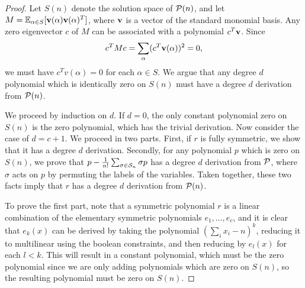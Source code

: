 \begin{proof}
Let $S(n)$ denote the solution space of $\mathcal P(n)$, and let $M = \operatorname*{\mathbb{E}}_{\alpha \in S}[{\bf v}(\alpha){\bf v}(\alpha)^T]$, where ${\bf v}$ is a vector of the standard monomial basis. Any zero eigenvector $c$ of $M$ can be associated with a polynomial $c^T{\bf v}$. Since 
\[c^TMc = \sum_\alpha (c^T{\bf v}(\alpha))^2 = 0,\]
we must have $c^Tv(\alpha) = 0$ for each $\alpha \in S$. We argue that any degree $d$ polynomial which is identically zero on $S(n)$ must have a degree $d$ derivation from $\mathcal P(n)$. 

We proceed by induction on $d$. If $d = 0$, the only constant polynomial zero on $S(n)$ is the zero polynomial, which has the trivial derivation. Now consider the case of $d = c+1$. We proceed in two parts. First, if $r$ is fully symmetric, we show that it has a degree $d$ derivation. Secondly, for any polynomial $p$ which is zero on $S(n)$, we prove that $p - \frac{1}{n!}\sum_{\sigma \in \mathcal S_n} \sigma p$ has a degree $d$ derivation from $\mathcal P$, where $\sigma$ acts on $p$ by permuting the labels of the variables. Taken together, these two facts imply that $r$ has a degree $d$ derivation from $\mathcal P(n)$.

To prove the first part, note that a symmetric polynomial $r$ is a linear combination of the elementary symmetric polynomials $e_1,\dots,e_c$, and it is clear that $e_k(x)$ can be derived by taking the polynomial $(\sum_i x_i - n)^k$, reducing it to multilinear using the boolean constraints, and then reducing by $e_l(x)$ for each $l < k$. This will result in a constant polynomial, which must be the zero polynomial since we are only adding polynomials which are zero on $S(n)$, so the resulting polynomial must be zero on $S(n)$. 


\end{proof}
